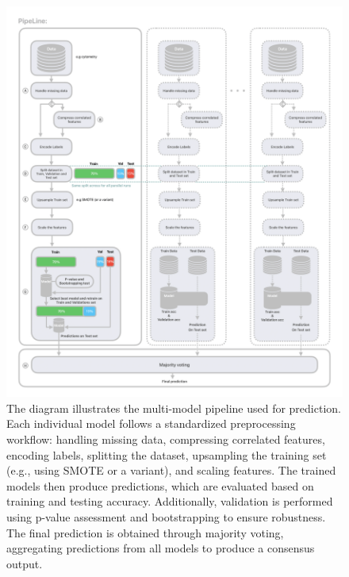 \documentclass[12pt,a4paper]{report}
\begin{document}
\begin{figure}[H]
  \centering
  \hspace*{-0.9cm}
  \includegraphics[width=1.1\textwidth]{images/Pipeline-1.png}
  \caption[Consensus model pipeline diagram]{The diagram illustrates the multi-model pipeline used for prediction. Each individual model follows a standardized preprocessing workflow: handling missing data, compressing correlated features, encoding labels, splitting the dataset, upsampling the training set (e.g., using SMOTE or a variant), and scaling features. The trained models then produce predictions, which are evaluated based on training and testing accuracy. Additionally, validation is performed using p-value assessment and bootstrapping to ensure robustness. The final prediction is obtained through majority voting, aggregating predictions from all models to produce a consensus output.}
  \label{fig:pipeline-1}
\end{figure}
\end{document}
